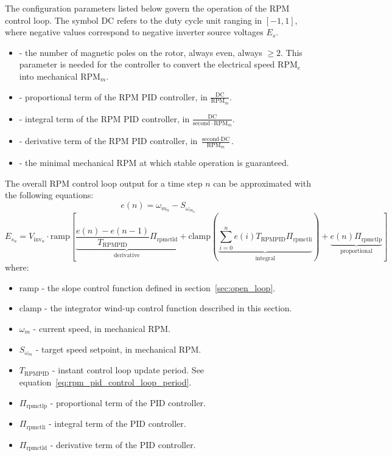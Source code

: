 \documentclass{zubaxdoc}
\begin{document}
The configuration parameters listed below govern the operation of the RPM control loop.
The symbol $\text{DC}$ refers to the duty cycle unit ranging in $\left[-1, 1\right]$,
where negative values correspond to negative inverter source voltages $E_s$.

\begin{itemize}
	\item {} - the number of magnetic poles on the rotor, always even, always $\geq 2$.
	This parameter is needed for the controller to convert the electrical speed $\text{RPM}_e$
	into mechanical $\text{RPM}_m$.
	\item {} - proportional term of the RPM PID controller,
	in $\frac{\text{DC}}{\text{RPM}_m}$.
	\item {} - integral term of the RPM PID controller,
	in $\frac{\text{DC}}{\text{second}\cdot{}\text{RPM}_m}$.
	\item {} - derivative term of the RPM PID controller,
	in $\frac{\text{second}\cdot{}\text{DC}}{\text{RPM}_m}$.
	\item {} - the minimal mechanical RPM at which stable operation is guaranteed.
\end{itemize}

The overall RPM control loop output for a time step $n$ can be approximated with the following equations:
\begin{equation}
	e(n) = \omega_{m_{n}} - S_{\omega_{m_{n}}}
\end{equation}
\begin{equation}
	E_{s_n} = V_{\text{inv}_n}\cdot\mathrm{ramp}
	\left[
	\underbrace{\frac{e\left(n\right) - e\left(n-1\right)}{T_{\text{RPMPID}}} \Pi_{\text{rpmctld}}}_\text{derivative} +
	\mathrm{clamp}\left(
	\underbrace{\sum_{i=0}^n e\left(i\right) T_{\text{RPMPID}} \Pi_{\text{rpmctli}}}_\text{integral}
	\right) +
	\underbrace{e\left(n\right) \Pi_{\text{rpmctlp}}}_\text{proportional}
	\right]
\end{equation}
where:
\begin{itemize}
	\item $\mathrm{ramp}$ - the slope control function defined in section~\ref{sec:open_loop}.
	\item $\mathrm{clamp}$ - the integrator wind-up control function described in this section.
	\item $\omega_{m}$ - current speed, in mechanical RPM.
	\item $S_{\omega_{m}}$ - target speed setpoint, in mechanical RPM.
	\item $T_{\text{RPMPID}}$ - instant control loop update period.
	See equation~\ref{eq:rpm_pid_control_loop_period}.
	\item $\Pi_{\text{rpmctlp}}$ - proportional term of the PID controller.
	\item $\Pi_{\text{rpmctli}}$ - integral term of the PID controller.
	\item $\Pi_{\text{rpmctld}}$ - derivative term of the PID controller.
\end{itemize}
\end{document}
